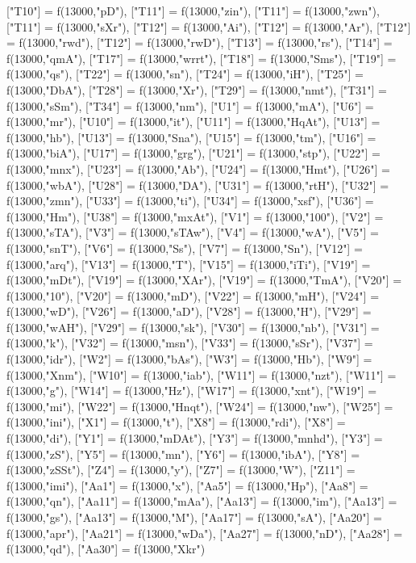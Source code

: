 \documentclass{article}
\begin{document}
\begin{luacode*}
{	["T10"] = f(13000,"pD"),
	["T11"] = f(13000,"zin"),
	["T11"] = f(13000,"zwn"),
	["T11"] = f(13000,"sXr"),
	["T12"] = f(13000,"Ai"),
	["T12"] = f(13000,"Ar"),
	["T12"] = f(13000,"rwd"),
	["T12"] = f(13000,"rwD"),
	["T13"] = f(13000,"rs"),
	["T14"] = f(13000,"qmA"),
	["T17"] = f(13000,"wrrt"),
	["T18"] = f(13000,"Sms"),
	["T19"] = f(13000,"qs"),
	["T22"] = f(13000,"sn"),
	["T24"] = f(13000,"iH"),
	["T25"] = f(13000,"DbA"),
	["T28"] = f(13000,"Xr"),
	["T29"] = f(13000,"nmt"),
	["T31"] = f(13000,"sSm"),
	["T34"] = f(13000,"nm"),
	["U1"] = f(13000,"mA"),
	["U6"] = f(13000,"mr"),
	["U10"] = f(13000,"it"),
	["U11"] = f(13000,"HqAt"),
	["U13"] = f(13000,"hb"),
	["U13"] = f(13000,"Sna"),
	["U15"] = f(13000,"tm"),
	["U16"] = f(13000,"biA"),
	["U17"] = f(13000,"grg"),
	["U21"] = f(13000,"stp"),
	["U22"] = f(13000,"mnx"),
	["U23"] = f(13000,"Ab"),
	["U24"] = f(13000,"Hmt"),
	["U26"] = f(13000,"wbA"),
	["U28"] = f(13000,"DA"),
	["U31"] = f(13000,"rtH"),
	["U32"] = f(13000,"zmn"),
	["U33"] = f(13000,"ti"),
	["U34"] = f(13000,"xsf"),
	["U36"] = f(13000,"Hm"),
	["U38"] = f(13000,"mxAt"),
	["V1"] = f(13000,"100"),
	["V2"] = f(13000,"sTA"),
	["V3"] = f(13000,"sTAw"),
	["V4"] = f(13000,"wA"),
	["V5"] = f(13000,"snT"),
	["V6"] = f(13000,"Ss"),
	["V7"] = f(13000,"Sn"),
	["V12"] = f(13000,"arq"),	
	["V13"] = f(13000,"T"),
	["V15"] = f(13000,"iTi"),
	["V19"] = f(13000,"mDt"),
	["V19"] = f(13000,"XAr"),
	["V19"] = f(13000,"TmA"),
	["V20"] = f(13000,"10"),
	["V20"] = f(13000,"mD"),
	["V22"] = f(13000,"mH"),
	["V24"] = f(13000,"wD"),
	["V26"] = f(13000,"aD"),
	["V28"] = f(13000,"H"),
	["V29"] = f(13000,"wAH"),
	["V29"] = f(13000,"sk"),
	["V30"] = f(13000,"nb"),
	["V31"] = f(13000,"k"),
	["V32"] = f(13000,"msn"),
	["V33"] = f(13000,"sSr"),
	["V37"] = f(13000,"idr"),
	["W2"] = f(13000,"bAs"),
	["W3"] = f(13000,"Hb"),
	["W9"] = f(13000,"Xnm"),
	["W10"] = f(13000,"iab"),
	["W11"] = f(13000,"nzt"),
	["W11"] = f(13000,"g"),
	["W14"] = f(13000,"Hz"),
	["W17"] = f(13000,"xnt"),
	["W19"] = f(13000,"mi"),
	["W22"] = f(13000,"Hnqt"),
	["W24"] = f(13000,"nw"),
	["W25"] = f(13000,"ini"),
	["X1"] = f(13000,"t"),
	["X8"] = f(13000,"rdi"),
	["X8"] = f(13000,"di"),
	["Y1"] = f(13000,"mDAt"),
	["Y3"] = f(13000,"mnhd"),
	["Y3"] = f(13000,"zS"),
	["Y5"] = f(13000,"mn"),
	["Y6"] = f(13000,"ibA"),
	["Y8"] = f(13000,"zSSt"),
	["Z4"] = f(13000,"y"),
	["Z7"] = f(13000,"W"),
	["Z11"] = f(13000,"imi"),
	["Aa1"] = f(13000,"x"),
	["Aa5"] = f(13000,"Hp"),
	["Aa8"] = f(13000,"qn"),
	["Aa11"] = f(13000,"mAa"),
	["Aa13"] = f(13000,"im"),
	["Aa13"] = f(13000,"gs"),
	["Aa13"] = f(13000,"M"),
	["Aa17"] = f(13000,"sA"),
	["Aa20"] = f(13000,"apr"),
	["Aa21"] = f(13000,"wDa"),
	["Aa27"] = f(13000,"nD"),
	["Aa28"] = f(13000,"qd"),
	["Aa30"] = f(13000,"Xkr")
}


\end{luacode*}
\end{document}
